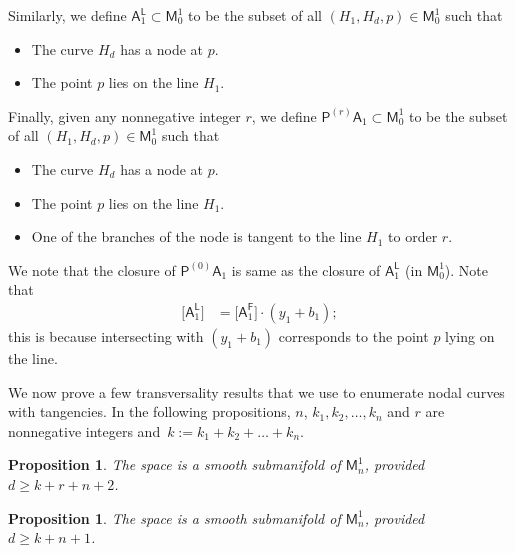 \documentclass[pdftex]{sigma}
\numberwithin{equation}{section}
\newtheorem{prp}[thm]{Proposition}
\begin{document}
Similarly, we define
$\mathsf{A}_1^{\mathsf{L}} \subset \mathsf{M}^1_0$ to be the subset of all
$(H_1, H_d, p) \in \mathsf{M}^1_0$ such that
\begin{itemize}\itemsep=0pt
\item The curve $H_d$ has a node at $p$.
\item The point $p$ lies on the line $H_1$.
\end{itemize}
Finally, given any nonnegative integer $r$, we define
$\mathsf{P}^{(r)}\mathsf{A}_1\!\subset\! \mathsf{M}^1_0$ to be the
subset of all
$(H_1, H_d, p)\! \in \mathsf{M}^1_0$ such that
\begin{itemize}\itemsep=0pt
\item The curve $H_d$ has a node at $p$.
\item The point $p$ lies on the line $H_1$.
\item One of the branches of the node is tangent to the line $H_1$ to order $r$.
\end{itemize}

We note that the closure of $\mathsf{P}^{(0)}\mathsf{A}_1$ is same as the
closure of $\mathsf{A}_1^{\mathsf{L}}$ \big(in $\mathsf{M}^1_0$\big).
Note that
\begin{align}
\bigl[\mathsf{A}_1^{\mathsf{L}}\bigr] &  =  \bigl[\mathsf{A}_1^{\mathsf{F}}\bigr]\cdot (y_1 + b_1);
\label{a1_line_cycle}
\end{align}
this is because intersecting with $(y_1+b_1)$ corresponds to the point $p$ lying on the line.

We now prove a few transversality results that we use to enumerate nodal curves
with tangencies.
In the following propositions,
$n$, $k_1, k_2,\dots, k_{n}$ and $r$ are nonnegative integers
and~${k := k_1+k_2 + \dots+ k_n}$.

\begin{prp}\label{prp_smth_mfld_with_PA1r_ag}
The space
is a smooth submanifold of $\mathsf{M}_{n}^{1}$, provided
$d \geq k+r+n+2$.
\end{prp}

\begin{prp}
\label{prp_smth_mfld_with_A1f_ag}
The space
is a smooth submanifold of $\mathsf{M}_{n}^{1}$, provided $d \geq k+n+1$.
\end{prp}
\end{document}
